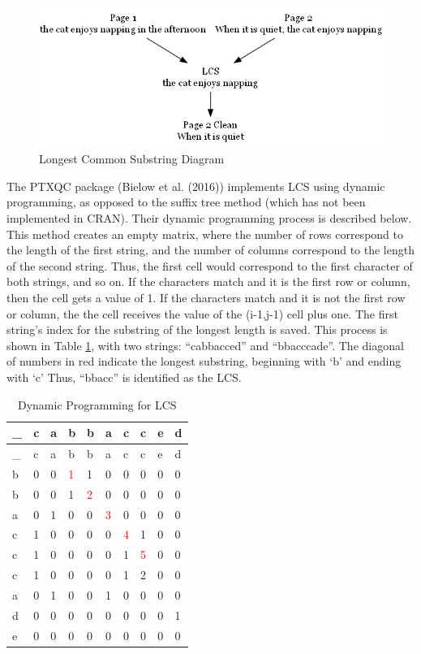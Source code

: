 \documentclass[print]{nuthesis}
\begin{document}
\begin{figure}

{\centering \includegraphics[width=\linewidth]{images/svg_graph} 

}

\caption{Longest Common Substring Diagram}\label{fig:lcs}
\end{figure}

The PTXQC package (Bielow et al. (2016)) implements LCS using dynamic programming, as opposed to the suffix tree method (which has not been implemented in CRAN).
Their dynamic programming process is described below.
This method creates an empty matrix, where the number of rows correspond to the length of the first string, and the number of columns correspond to the length of the second string.
Thus, the first cell would correspond to the first character of both strings, and so on.
If the characters match and it is the first row or column, then the cell gets a value of 1.
If the characters match and it is not the first row or column, the the cell receives the value of the (i-1,j-1) cell plus one.
The first string's index for the substring of the longest length is saved.
This process is shown in Table \ref{tab:dylcs}, with two strings: ``cabbacced'' and ``bbacccade''.
The diagonal of numbers in red indicate the longest substring, beginning with `b' and ending with `c'
Thus, ``bbacc'' is identified as the LCS.

\begin{longtable}[]{@{}llllllllll@{}}
\caption{Dynamic Programming for LCS \label{tab:dylcs}}\tabularnewline
\toprule\noalign{}
\_ & c & a & b & b & a & c & c & e & d \\
\midrule\noalign{}
\endfirsthead
\toprule\noalign{}
\_ & c & a & b & b & a & c & c & e & d \\
\midrule\noalign{}
\endhead
\bottomrule\noalign{}
\endlastfoot
b & 0 & 0 & \textcolor{red}{1} & 1 & 0 & 0 & 0 & 0 & 0 \\
b & 0 & 0 & 1 & \textcolor{red}{2} & 0 & 0 & 0 & 0 & 0 \\
a & 0 & 1 & 0 & 0 & \textcolor{red}{3} & 0 & 0 & 0 & 0 \\
c & 1 & 0 & 0 & 0 & 0 & \textcolor{red}{4} & 1 & 0 & 0 \\
c & 1 & 0 & 0 & 0 & 0 & 1 & \textcolor{red}{5} & 0 & 0 \\
c & 1 & 0 & 0 & 0 & 0 & 1 & 2 & 0 & 0 \\
a & 0 & 1 & 0 & 0 & 1 & 0 & 0 & 0 & 0 \\
d & 0 & 0 & 0 & 0 & 0 & 0 & 0 & 0 & 1 \\
e & 0 & 0 & 0 & 0 & 0 & 0 & 0 & 0 & 0 \\
\end{longtable}
\end{document}
